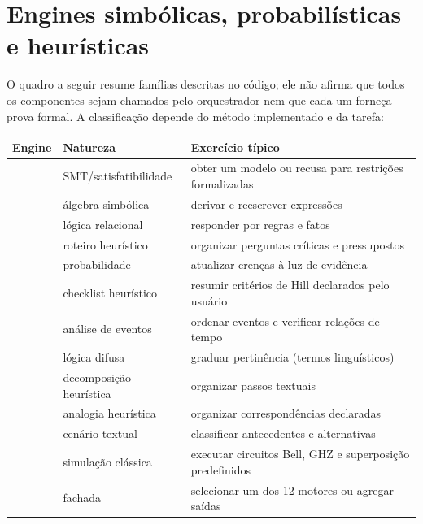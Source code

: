 \clearpage
\section{Engines simbólicas, probabilísticas e heurísticas}


\begin{resultado}
O quadro a seguir resume famílias descritas no código; ele não afirma que todos
os componentes sejam chamados pelo orquestrador nem que cada um forneça prova
formal. A classificação depende do método implementado e da tarefa: \par
\smallskip
{\footnotesize
\begin{tabularx}{\linewidth}{Y Y Y}
\toprule
Engine & Natureza & Exercício típico \\
\midrule
{} & SMT/satisfatibilidade & obter um modelo ou recusa para restrições formalizadas \\
 & álgebra simbólica & derivar e reescrever expressões \\
 & lógica relacional & responder por regras e fatos \\
 & roteiro heurístico & organizar perguntas críticas e pressupostos \\
 & probabilidade & atualizar crenças à luz de evidência \\
 & checklist heurístico & resumir critérios de Hill declarados pelo usuário \\
 & análise de eventos & ordenar eventos e verificar relações de tempo \\
 & lógica difusa & graduar pertinência (termos linguísticos) \\
 & decomposição heurística & organizar passos textuais \\
 & analogia heurística & organizar correspondências declaradas \\
 & cenário textual & classificar antecedentes e alternativas \\
 & simulação clássica & executar circuitos Bell, GHZ e superposição predefinidos \\
 & fachada & selecionar um dos 12 motores ou agregar saídas \\
\bottomrule
\end{tabularx}\par}
\end{resultado}

